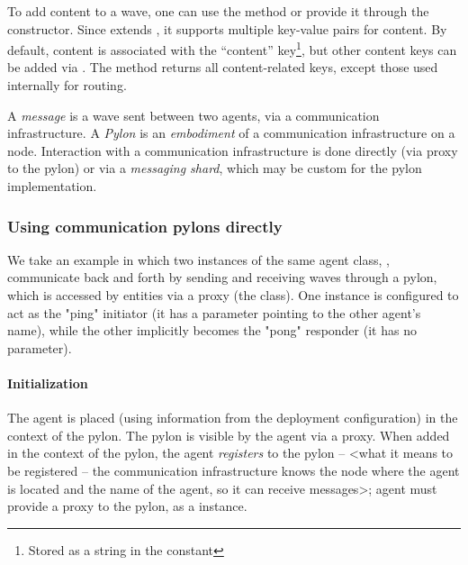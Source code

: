 \documentclass{article}
\begin{document}
To add content to a wave, one can use the  method or provide it through the constructor. Since  extends , it supports multiple key-value pairs for content. By default, content is associated with the ``content'' key\footnote{Stored as a string in the  constant}, but other content keys can be added via . The method  returns all content-related keys, except those used internally for routing.

A \emph{message} is a wave sent between two agents, via a communication infrastructure.
A \emph{Pylon} is an \emph{embodiment} of a communication infrastructure on a node.
Interaction with a communication infrastructure is done directly (via proxy to the pylon) or via a \emph{messaging shard}, which may be custom for the pylon implementation.


\subsubsection{Using communication pylons directly}\label{sec:using-pylons-directly}
We take an example in which two instances of the same agent class, , communicate back and forth by sending and receiving waves through a pylon, which is accessed by entities via a proxy (the  class). One instance is configured to act as the "ping" initiator (it has a  parameter pointing to the other agent’s name), while the other implicitly becomes the "pong" responder (it has no  parameter).


\paragraph{Initialization}

The agent is placed (using information from the deployment configuration) in the context of the pylon. The pylon is visible by the agent via a proxy.
When added in the context of the pylon, the agent \emph{registers} to the pylon -- <what it means to be registered -- the communication infrastructure knows the node where the agent is located and the name of the agent, so it can receive messages>; agent must provide a proxy to the pylon, as a  instance.
\end{document}
